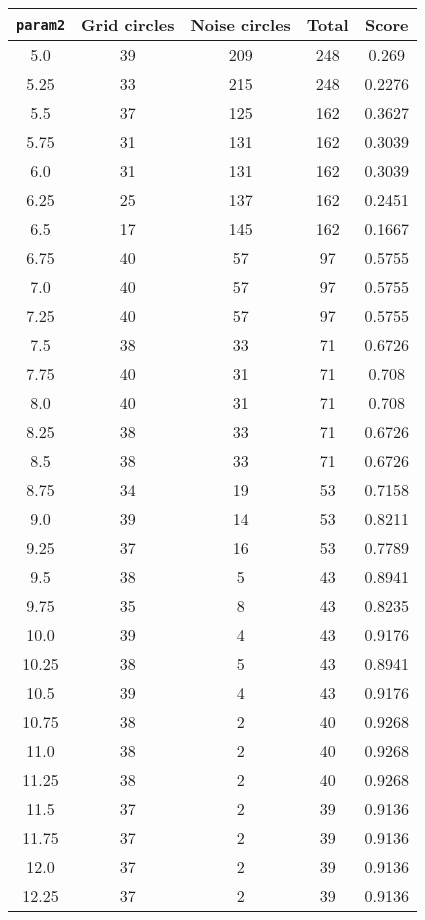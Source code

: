 \documentclass[letterpaper, 12pt]{article}
\begin{document}
\begin{longtable}{|c|c|c|c|c|}
\hline
\textbf{\texttt{param2}} & \textbf{Grid circles} & \textbf{Noise circles} & \textbf{Total} & \textbf{Score} \\
\hline
5.0 & 39 & 209 & 248 & 0.269 \\
\hline
5.25 & 33 & 215 & 248 & 0.2276 \\
\hline
5.5 & 37 & 125 & 162 & 0.3627 \\
\hline
5.75 & 31 & 131 & 162 & 0.3039 \\
\hline
6.0 & 31 & 131 & 162 & 0.3039 \\
\hline
6.25 & 25 & 137 & 162 & 0.2451 \\
\hline
6.5 & 17 & 145 & 162 & 0.1667 \\
\hline
6.75 & 40 & 57 & 97 & 0.5755 \\
\hline
7.0 & 40 & 57 & 97 & 0.5755 \\
\hline
7.25 & 40 & 57 & 97 & 0.5755 \\
\hline
7.5 & 38 & 33 & 71 & 0.6726 \\
\hline
7.75 & 40 & 31 & 71 & 0.708 \\
\hline
8.0 & 40 & 31 & 71 & 0.708 \\
\hline
8.25 & 38 & 33 & 71 & 0.6726 \\
\hline
8.5 & 38 & 33 & 71 & 0.6726 \\
\hline
8.75 & 34 & 19 & 53 & 0.7158 \\
\hline
9.0 & 39 & 14 & 53 & 0.8211 \\
\hline
9.25 & 37 & 16 & 53 & 0.7789 \\
\hline
9.5 & 38 & 5 & 43 & 0.8941 \\
\hline
9.75 & 35 & 8 & 43 & 0.8235 \\
\hline
10.0 & 39 & 4 & 43 & 0.9176 \\
\hline
10.25 & 38 & 5 & 43 & 0.8941 \\
\hline
10.5 & 39 & 4 & 43 & 0.9176 \\
\hline
10.75 & 38 & 2 & 40 & 0.9268 \\
\hline
11.0 & 38 & 2 & 40 & 0.9268 \\
\hline
11.25 & 38 & 2 & 40 & 0.9268 \\
\hline
11.5 & 37 & 2 & 39 & 0.9136 \\
\hline
11.75 & 37 & 2 & 39 & 0.9136 \\
\hline
12.0 & 37 & 2 & 39 & 0.9136 \\
\hline
12.25 & 37 & 2 & 39 & 0.9136 \\
\hline

\end{longtable}
\end{document}
